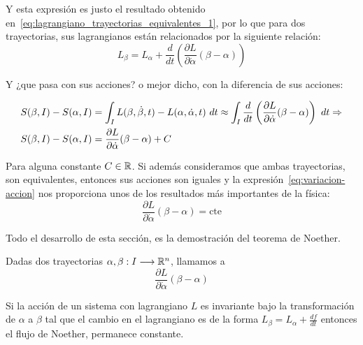 Y esta expresión es justo el resultado obtenido en~\ref{eq:lagrangiano_trayectorias_equivalentes_1}, por lo que para dos trayectorias, sus lagrangianos están relacionados por la siguiente relación:
\begin{equation}
    \label{eq:lagrangianos_relacionados}
    L_\beta=L_\alpha+\frac{d}{dt}\left(\frac{\partial L}{\partial\dot{\alpha}}(\beta-\alpha)\right)
\end{equation}

Y ¿que pasa con sus acciones? o mejor dicho, con la diferencia de sus acciones:

\begin{equation}
    \label{eq:variacion-accion}
    \begin{align}
        S(\beta, I)-S(\alpha, I) & = \int_I L(\beta, \dot{\beta}, t)- L(\alpha, \dot{\alpha}, t)\ dt\approx\int_I\frac{d}{dt}\left(\frac{\partial L}{\partial\dot{\alpha}}(\beta-\alpha)\right)\ dt\so \\
        S(\beta, I)-S(\alpha, I) & = \frac{\partial L}{\partial\dot{\alpha}}(\beta-\alpha)+C
    \end{align}
\end{equation}

Para alguna constante $C\in\mathbb{R}$.
Si además consideramos que ambas trayectorias, son equivalentes, entonces sus acciones son iguales y la expresión~\ref{eq:variacion-accion} nos proporciona unos de los resultados más importantes de la física:
\begin{equation*}
    \frac{\partial L}{\partial\dot{\alpha}}(\beta-\alpha) = \text{cte}
\end{equation*}

Todo el desarrollo de esta sección, es la demostración del teorema de Noether.

\begin{definition}
    Dadas dos trayectorias $\alpha,\beta:I\longrightarrow \mathbb{R}^n$, llamamos  a
    \begin{equation}
        \label{eq:flujo_noether}
        \frac{\partial L}{\partial\dot{\alpha}}(\beta-\alpha)
    \end{equation}
\end{definition}

\begin{theorem}
    \label{thm:noether}
    Si la acción de un sistema con lagrangiano $L$ es invariante bajo la transformación de $\alpha$ a $\beta$ tal que el cambio en el lagrangiano es de la forma $L_\beta=L_\alpha+\frac{df}{dt}$ entonces el flujo de Noether, permanece constante.
\end{theorem}


